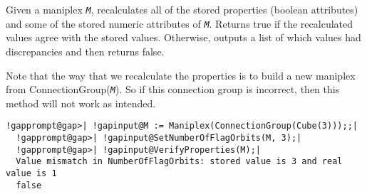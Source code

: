 \documentclass[a4paper,11pt]{report}
\begin{document}
{{{ Given a maniplex \mbox{\texttt{\mdseries\slshape M}}, recalculates all of the stored properties (boolean attributes) and some of
the stored numeric attributes of \mbox{\texttt{\mdseries\slshape M}}. Returns true if the recalculated values agree with the stored values.
Otherwise, outputs a list of which values had discrepancies and then returns
false. 

 Note that the way that we recalculate the properties is to build a new
maniplex from ConnectionGroup(\mbox{\texttt{\mdseries\slshape M}}). So if this connection group is incorrect, then this method will not work as
intended. 
\begin{Verbatim}[commandchars=!@|,fontsize=\small,frame=single,label=Example]
  !gapprompt@gap>| !gapinput@M := Maniplex(ConnectionGroup(Cube(3)));;|
  !gapprompt@gap>| !gapinput@SetNumberOfFlagOrbits(M, 3);|
  !gapprompt@gap>| !gapinput@VerifyProperties(M);|
  Value mismatch in NumberOfFlagOrbits: stored value is 3 and real value is 1
  false
\end{Verbatim}
 }

 }

 }

   
\end{document}
